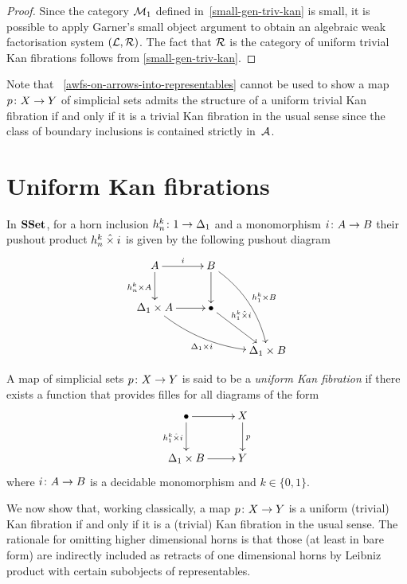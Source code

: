 \documentclass[reqno,10pt,a4paper,oneside]{amsart}
\begin{document}
\begin{proof} Since the category $\cal{M}_1$ defined in~\cref{small-gen-triv-kan} is small,  
it is possible to apply Garner's small object argument to
obtain an algebraic weak factorisation system $(\cal{L}, \cal{R})$.
The fact that $\cal{R}$ is the category of uniform trivial Kan fibrations
 follows from \cref{small-gen-triv-kan}.
 \end{proof} 

Note that ~\cref{awfs-on-arrows-into-representables} cannot be used to show 
a map $p \co X \to Y$ of simplicial sets admits the structure of a uniform trivial Kan fibration if and only if it is a trivial Kan fibration in the usual sense since  the class of boundary inclusions  is contained strictly  in~$\cal{A}$. 




\section{Uniform Kan fibrations}




 In $\SSet$, for a horn inclusion $h^{k}_n \co 1 \to \Delta_1$ and  a monomorphism $i \co A \to B$
their pushout product $h^k_n \hattimes i$ is given by the following pushout diagram
\[
\xymatrix{
 A \ar[r]^{i}  \ar[d]_{h^k_n \times A} &  B \ar@/^1em/[ddr]^{h^k_1 \times B} \ar[d] & \\ 
\Delta_1 \times A \ar@/_1em/[drr]_{\Delta_1 \times i} \ar[r] & \bullet \ar[dr]^-(.35){h^k_1 \hattimes i}  & \\ 
 & & \Delta_1 \times B} 
 \]
 
 

\begin{definition} A map of simplicial sets $p \co X \to Y$ is said to be a \emph{uniform Kan fibration} if there exists
a function that provides filles for all diagrams of the form
\[
\xymatrix{
\bullet \ar[r] \ar[d]_{h^k_1 \hattimes i} & X \ar[d]^p \\
\Delta_1 \times B \ar[r] & Y}
\]
where $i \co A \to B$ is a decidable monomorphism and $k \in \{0, 1\}$. 

\end{definition} 




We now show that, working classically, a map $p \co X \to Y$ is a uniform (trivial) Kan fibration if and only
if it is a (trivial) Kan fibration in the usual sense. 
 The rationale for omitting higher dimensional horns is that those (at least in bare form) are indirectly included as retracts of one dimensional horns by Leibniz product with certain subobjects of representables. 
\end{document}
